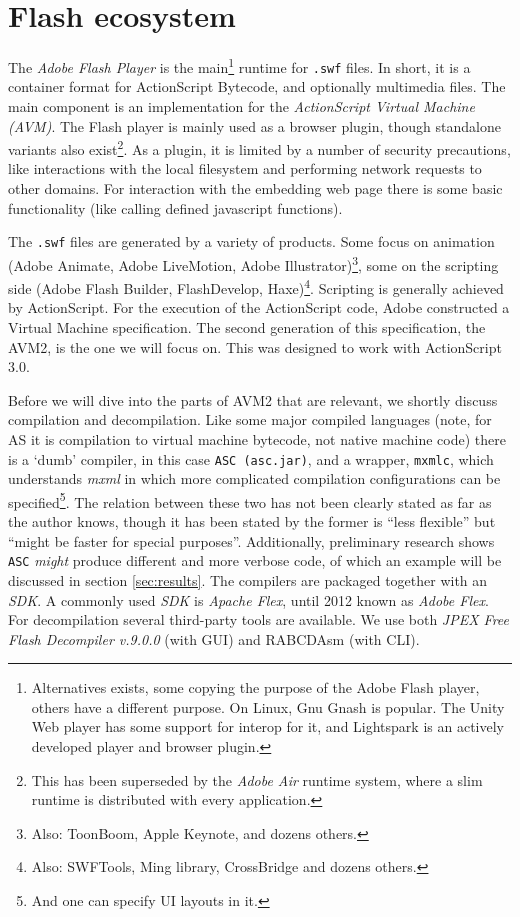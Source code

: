 \documentclass[a4paper,11pt]{scrartcl}
\begin{document}
\section{Flash ecosystem}
\label{sec:ecosystem}
The \textit{Adobe Flash Player} is the main\footnote{Alternatives exists, some copying the purpose of the Adobe Flash player, others have a different purpose.  On Linux, Gnu Gnash is popular. The Unity Web player has some support for interop for it, and Lightspark is an actively developed player and browser plugin. } runtime for \texttt{.swf} files. In short, it is a container format for ActionScript Bytecode, and optionally multimedia files. The main component is an implementation for the \textit{ActionScript Virtual Machine (AVM)}. The Flash player is mainly used as a browser plugin, though standalone variants also exist\footnote{This has been superseded by the \textit{Adobe Air} runtime system, where a slim runtime is distributed with every application.}. As a plugin, it is limited by a number of security precautions, like interactions with the local filesystem and performing network requests to other domains. For interaction with the embedding web page there is some basic functionality (like calling defined javascript functions).

The \texttt{.swf} files are generated by a variety of products. Some focus on animation (Adobe Animate, Adobe LiveMotion, Adobe Illustrator)\footnote{Also: ToonBoom, Apple Keynote, and dozens others.}, some on the scripting side (Adobe Flash Builder, FlashDevelop, Haxe)\footnote{Also: SWFTools, Ming library, CrossBridge and dozens others.}. Scripting is generally achieved by ActionScript. For the execution of the ActionScript code, Adobe constructed a Virtual Machine specification. The second generation of this specification, the AVM2, is the one we will focus on. This was designed to work with ActionScript 3.0.

Before we will dive into the parts of AVM2 that are relevant, we shortly discuss compilation and decompilation. Like some major compiled languages (note, for AS it is compilation to virtual machine bytecode, not native machine code) there is a `dumb' compiler, in this case \texttt{ASC (asc.jar)}, and a wrapper, \texttt{mxmlc}, which understands \textit{mxml} in which more complicated compilation configurations can be specified\footnote{And one can specify UI layouts in it.}. The relation between these two has not been clearly stated as far as the author knows, though it has been stated by \cite{smith2009} the former is ``less flexible'' but ``might be faster for special purposes''. Additionally, preliminary research shows \texttt{ASC} \textit{might} produce different and more verbose code, of which an example will be discussed in section \ref{sec:results}. The compilers are packaged together with an \textit{SDK}. A commonly used \textit{SDK} is \textit{Apache Flex}, until 2012 known as \textit{Adobe Flex}. For decompilation several third-party tools are available. We use both \textit{JPEX Free Flash Decompiler v.9.0.0} (with GUI) and RABCDAsm (with CLI).
\end{document}
